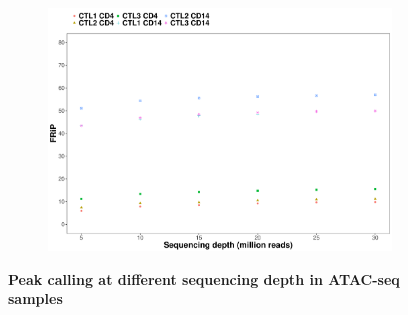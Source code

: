 \begin{figure}[htbp]
\begin{subfigure}{0.5\textwidth}
\caption{\textbf{}}
\end{subfigure} \\
\begin{subfigure}{0.5\textwidth}
\centering
\includegraphics[width=\textwidth]{./Results1/pdfs/ATAC_Core_fresh_CD4_CD14_frac_reads_in_peaks_vs_depth}
\caption{\textbf{}} %
\end{subfigure}%
\caption[Peak calling and sequencing depth in ATAC-seq samples]{\textbf{Peak calling at different sequencing depth in ATAC-seq samples} \\
}
\label{fig:Peak_calling_versus_depth_ATAC}
\end{figure} 




